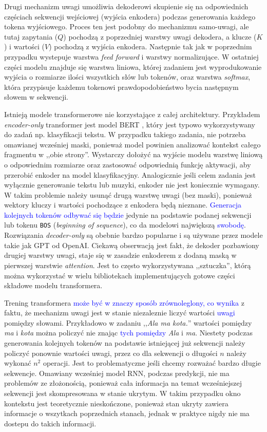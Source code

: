 \documentclass[data-science]{agh-wi} %
\begin{document}
Drugi mechanizm uwagi umożliwia dekoderowi skupienie się na odpowiednich częściach sekwencji wejściowej (wyjścia enkodera) podczas generowania każdego tokena wyjściowego. Proces ten jest podobny do mechanizmu samo-uwagi, ale tutaj zapytania ($Q$) pochodzą z poprzedniej warstwy uwagi dekodera, a klucze ($K$) i wartości ($V$) pochodzą z wyjścia enkodera. Następnie tak jak w poprzednim przypadku wystepuje warstwa \textit{feed forward} i warstwy normalizujące. W ostatniej części modelu znajduje się warstwa liniowa, której zadaniem jest wyprodukowanie wyjścia o rozmiarze ilości wszystkich słów lub tokenów, oraz warstwa \textit{softmax}, która przypisuje każdemu tokenowi prawdopodobieństwo bycia następnym słowem w sekwencji.

Istnieją modele transformerowe nie korzystające z całej architektury. Przykładem \textit{encoder-only} transformer jest model BERT \cite{bert}, który jest typowo wykorzystywany do zadań np. klasyfikacji tekstu. W przypadku takiego zadania, nie potrzeba omawianej wcześniej maski, ponieważ model powinien analizować kontekst całego fragmentu w ,,obie strony''. Wystarczy dołożyć na wyjście modelu warstwę liniową o odpowiednim rozmiarze oraz zastosować odpowiednią funkcję aktywacji, aby przerobić enkoder na model klasyfikacyjny.
Analogicznie jeśli celem zadania jest wyłącznie generowanie tekstu lub muzyki, enkoder nie jest koniecznie wymagany. W takim problemie należy usunąć drugą warstwę uwagi (bez maski), ponieważ wektory kluczy i wartości pochodzące z enkodera będą nieznane. \textcolor{blue}{Generacja kolejnych tokenów odbywać się będzie} jedynie na podstawie podanej sekwencji lub tokenu \texttt{BOS} (\textit{beginning of sequence}), co da modelowi największą \textcolor{blue}{swobodę}. Rozwiązania \textit{decoder-only} są obebnie bardzo popularne i są używane przez modele takie jak GPT od OpenAI. Ciekawą obserwacją jest fakt, że dekoder pozbawiony drugiej warstwy uwagi, staje się w zasadzie enkoderem z dodaną maską w pierwszej warstwie \textit{attention}. Jest to często wykorzystywana ,,sztuczka'', którą można wykorzystać w wielu bibliotekach implementujących gotowe części składowe modelu transformera.

Trening transformera \textcolor{blue}{może być w znaczy sposób zrównoleglony, co wynika} z faktu, że mechanizm uwagi jest w stanie niezaleznie liczyć wartości \textcolor{blue}{uwagi} pomiędzy słowami. Przykładowo w zadaniu ,,\textit{Ala ma kota.}'' wartości pomiędzy \textit{ma} i \textit{kota} można policzyć nie znając \textcolor{blue}{tych pomiędzy} \textit{Ala} i \textit{ma}. Niestety podczas generowania kolejnych tokenów na podstawie istniejącej już sekwencji należy policzyć ponownie wartości uwagi, przez co dla sekwencji o długości $n$ należy wykonać $n^2$ operacji. Jest to problematyczne jeśli chcemy rozważać bardzo długie sekwencje. Omawiany wcześniej model RNN, podczas predykcji, nie ma problemów ze złożonością, ponieważ cała informacja na temat wcześniejszej sekwencji jest skompresowana w stanie ukrytym. W takim przypadku okno kontekstu jest teoretycznie nieskończone, ponieważ stan ukryty zawiera informacje o wszytkach poprzednich stanach, jednak w praktyce nigdy nie ma dostepu do takich informacji.
\end{document}
